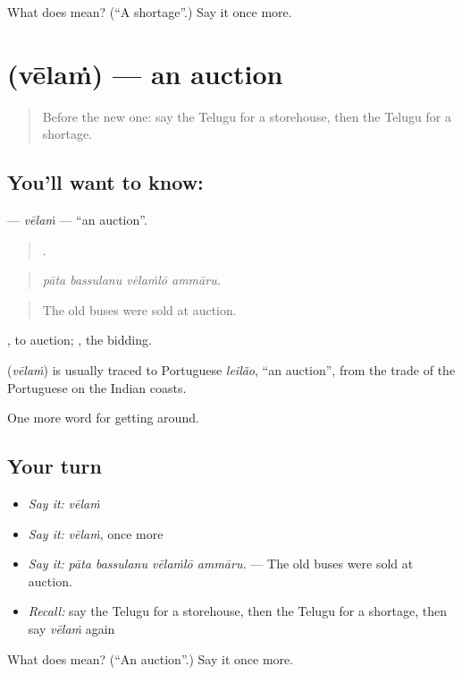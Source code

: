 \begin{tcolorbox}[breakable,colback=teal!4,colframe=teal!35!black,title={Before you move on}]
What does  mean? (\textquotedblleft{}A shortage\textquotedblright{}.) Say it once more.
\end{tcolorbox}
\section[\texorpdfstring{\te{వేలం} (vēlaṁ)}{వేలం (vēlaṁ)}]{ (vēlaṁ) — an auction}

\label{lesson:TE-C488-velam}



\begin{quote}
Before the new one: say the Telugu for a storehouse, then the Telugu for a shortage.
\end{quote}

\subsection*{You'll want to know: }
\textbf{} — \emph{vēlaṁ} — \textquotedblleft{}an auction\textquotedblright{}.

\begin{quote}
   .
\end{quote}

\begin{quote}
\emph{pāta bassulanu vēlaṁlō ammāru.}
\end{quote}

\begin{quote}
The old buses were sold at auction.
\end{quote}

 , to auction; , the bidding.

\begin{cousinweb}
\textbf{} (\emph{vēlaṁ}) is usually traced to Portuguese \emph{leilão}, \textquotedblleft{}an auction\textquotedblright{}, from the trade of the Portuguese on the Indian coasts.
\end{cousinweb}

\begin{grammarlens}[title={What you've built}]
One more word for getting around.
\end{grammarlens}

\subsection*{Your turn}
\begin{itemize}
\raggedright
  \item \emph{Say it:} \emph{vēlaṁ}
  \item \emph{Say it:} \emph{vēlaṁ}, once more
  \item \emph{Say it:} \emph{pāta bassulanu vēlaṁlō ammāru.} — The old buses were sold at auction.
  \item \emph{Recall:} say the Telugu for a storehouse, then the Telugu for a shortage, then say \emph{vēlaṁ} again
\end{itemize}

\begin{tcolorbox}[breakable,colback=teal!4,colframe=teal!35!black,title={Before you move on}]
What does  mean? (\textquotedblleft{}An auction\textquotedblright{}.) Say it once more.
\end{tcolorbox}
